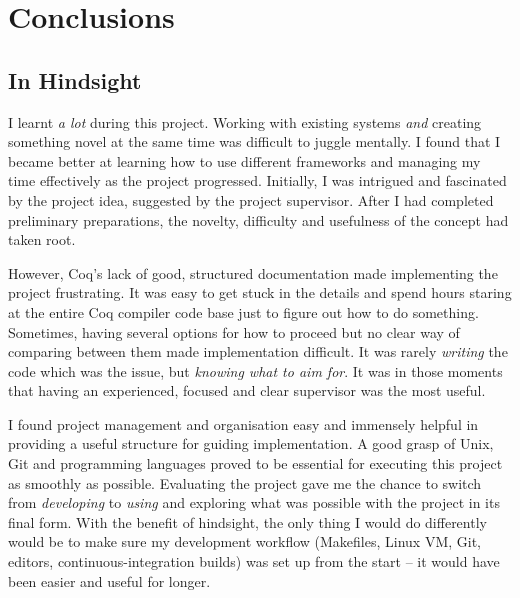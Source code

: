 \chapter{Conclusions}

%

\section{In Hindsight}

I learnt \emph{a lot} during this project.  Working with existing systems
\emph{and} creating something novel at the same time was difficult to juggle
mentally. I found that I became better at learning how to use different
frameworks and managing my time effectively as the project progressed.
Initially, I was intrigued and fascinated by the project idea, suggested by the
project supervisor. After I had completed preliminary preparations, the novelty,
difficulty and usefulness of the concept had taken root.

However, Coq's lack of good, structured documentation made implementing the
project frustrating.  It was easy to get stuck in the details and spend hours
staring at the entire Coq compiler code base just to figure out how to do
something.  Sometimes, having several options for how to proceed but no clear
way of comparing between them made implementation difficult. It was rarely
\emph{writing} the code which was the issue, but \emph{knowing what to aim for}.
It was in those moments that having an experienced, focused and clear supervisor
was the most useful.

I found project management and organisation easy and immensely helpful in
providing a useful structure for guiding implementation. A good grasp of Unix,
Git and programming languages proved to be essential for executing this project
as smoothly as possible. Evaluating the project gave me the chance to switch
from \emph{developing} to \emph{using} and exploring what was possible with the
project in its final form. With the benefit of hindsight, the only thing I would
do differently would be to make sure my development workflow (Makefiles, Linux
VM, Git, editors, continuous-integration builds) was set up from the start -- it
would have been easier and useful for longer.

